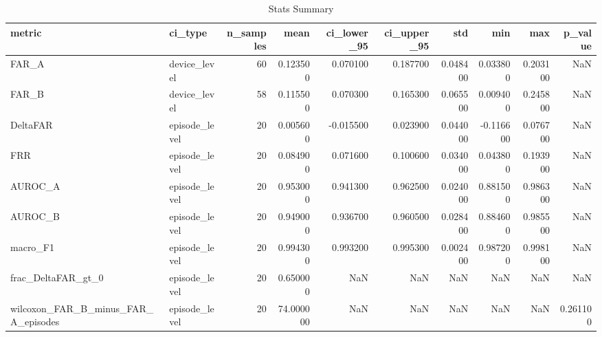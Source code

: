 \begin{table}
\caption{Stats Summary}
\label{tab_stats_summary}
\begin{tabular}{llrrrrrrrr}
\toprule
metric & ci_type & n_samples & mean & ci_lower_95 & ci_upper_95 & std & min & max & p_value \\
\midrule
FAR_A & device_level & 60 & 0.123500 & 0.070100 & 0.187700 & 0.048400 & 0.033800 & 0.203100 & NaN \\
FAR_B & device_level & 58 & 0.115500 & 0.070300 & 0.165300 & 0.065500 & 0.009400 & 0.245800 & NaN \\
DeltaFAR & episode_level & 20 & 0.005600 & -0.015500 & 0.023900 & 0.044000 & -0.116600 & 0.076700 & NaN \\
FRR & episode_level & 20 & 0.084900 & 0.071600 & 0.100600 & 0.034000 & 0.043800 & 0.193900 & NaN \\
AUROC_A & episode_level & 20 & 0.953000 & 0.941300 & 0.962500 & 0.024000 & 0.881500 & 0.986300 & NaN \\
AUROC_B & episode_level & 20 & 0.949000 & 0.936700 & 0.960500 & 0.028400 & 0.884600 & 0.985500 & NaN \\
macro_F1 & episode_level & 20 & 0.994300 & 0.993200 & 0.995300 & 0.002400 & 0.987200 & 0.998100 & NaN \\
frac_DeltaFAR_gt_0 & episode_level & 20 & 0.650000 & NaN & NaN & NaN & NaN & NaN & NaN \\
wilcoxon_FAR_B_minus_FAR_A_episodes & episode_level & 20 & 74.000000 & NaN & NaN & NaN & NaN & NaN & 0.261100 \\
\bottomrule
\end{tabular}
\end{table}
